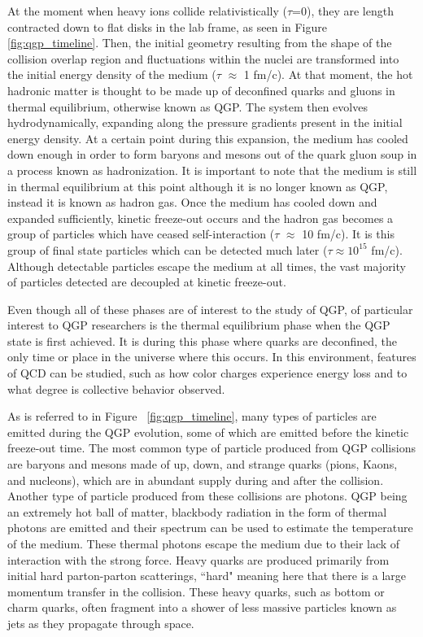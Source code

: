 At the moment when heavy ions collide relativistically ($\tau$=0), they are length contracted down to flat disks in the lab frame, as seen in Figure \ref{fig:qgp_timeline}. Then, the initial geometry resulting from the shape of the collision overlap region and fluctuations within the nuclei are transformed into the initial energy density of the medium ($\tau$ $\approx$ 1 fm/c). At that moment, the hot hadronic matter is thought to be made up of deconfined quarks and gluons in thermal equilibrium, otherwise known as QGP. The system then evolves hydrodynamically, expanding along the pressure gradients present in the initial energy density. At a certain point during this expansion, the medium has cooled down enough in order to form baryons and mesons out of the quark gluon soup in a process known as hadronization. It is important to note that the medium is still in thermal equilibrium at this point although it is no longer known as QGP, instead it is known as hadron gas. Once the medium has cooled down and expanded sufficiently, kinetic freeze-out occurs and the hadron gas becomes a group of particles which have ceased self-interaction ($\tau$ $\approx$ 10 fm/c). It is this group of final state particles which can be detected much later ($\tau \approx 10^{15}$ fm/c). Although detectable particles escape the medium at all times, the vast majority of particles detected are decoupled at kinetic freeze-out. 

Even though all of these phases are of interest to the study of QGP, of particular interest to QGP researchers is the thermal equilibrium phase when the QGP state is first achieved. It is during this phase where quarks are deconfined, the only time or place in the universe where this occurs. In this environment, features of QCD can be studied, such as how color charges experience energy loss and to what degree is collective behavior observed. 

As is referred to in Figure ~\ref{fig:qgp_timeline}, many types of particles are emitted during the QGP evolution, some of which are emitted before the kinetic freeze-out time. The most common type of particle produced from QGP collisions are baryons and mesons made of up, down, and strange quarks (pions, Kaons, and nucleons), which are in abundant supply during and after the collision. Another type of particle produced from these collisions are photons. QGP being an extremely hot ball of matter, blackbody radiation in the form of thermal photons are emitted and their spectrum can be used to estimate the temperature of the medium. These thermal photons escape the medium due to their lack of interaction with the strong force. Heavy quarks are produced primarily from initial hard parton-parton scatterings, ``hard" meaning here that there is a large momentum transfer in the collision. These heavy quarks, such as bottom or charm quarks, often fragment into a shower of less massive particles known as jets as they propagate through space.

